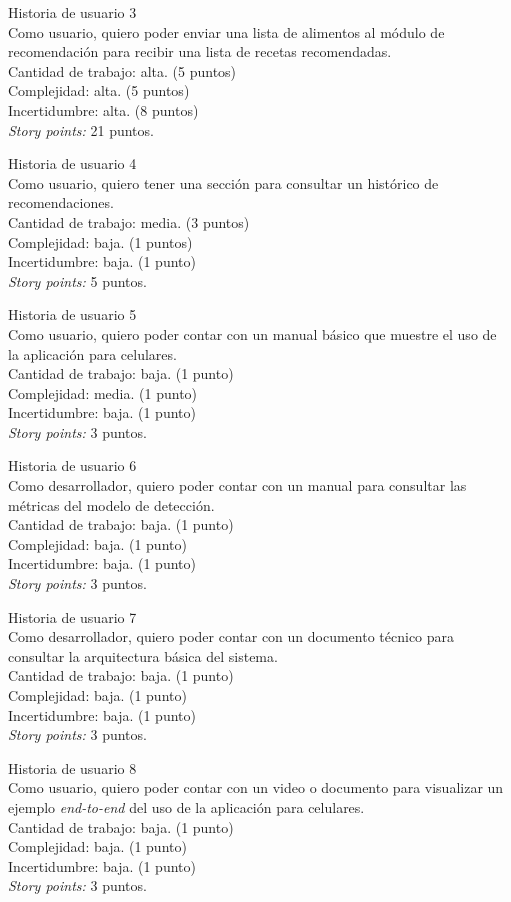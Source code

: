 \documentclass[
11pt, %
]{charter}
\begin{document}
Historia de usuario 3 \\
Como usuario, quiero poder enviar una lista de alimentos al módulo de recomendación para recibir una lista de recetas recomendadas. \\
Cantidad de trabajo: alta. (5 puntos)\\
Complejidad: alta. (5 puntos)\\
Incertidumbre: alta. (8 puntos)\\
\textit{Story points:} 21 puntos.

Historia de usuario 4 \\
Como usuario, quiero tener una sección para consultar un histórico de recomendaciones.\\
Cantidad de trabajo: media. (3 puntos)\\
Complejidad: baja. (1 puntos)\\
Incertidumbre: baja. (1 punto)\\
\textit{Story points:} 5 puntos.


Historia de usuario 5 \\
Como usuario, quiero poder contar con un manual básico que muestre el uso de la aplicación para celulares.\\
Cantidad de trabajo: baja. (1 punto)\\
Complejidad: media. (1 punto)\\
Incertidumbre: baja. (1 punto)\\
\textit{Story points:} 3 puntos.

Historia de usuario 6 \\
Como desarrollador, quiero poder contar con un manual para consultar las métricas del modelo de detección.\\
Cantidad de trabajo: baja. (1 punto)\\
Complejidad: baja. (1 punto)\\
Incertidumbre: baja. (1 punto)\\
\textit{Story points:} 3 puntos.

Historia de usuario 7 \\
Como desarrollador, quiero poder contar con un documento técnico para consultar la arquitectura básica del sistema.\\
Cantidad de trabajo: baja. (1 punto)\\
Complejidad: baja. (1 punto)\\
Incertidumbre: baja. (1 punto)\\
\textit{Story points:} 3 puntos.

Historia de usuario 8 \\
Como usuario, quiero poder contar con un video o documento para visualizar un ejemplo \textit{end-to-end} del uso de la aplicación para celulares.\\
Cantidad de trabajo: baja. (1 punto)\\
Complejidad: baja. (1 punto)\\
Incertidumbre: baja. (1 punto)\\
\textit{Story points:} 3 puntos.
\end{document}
